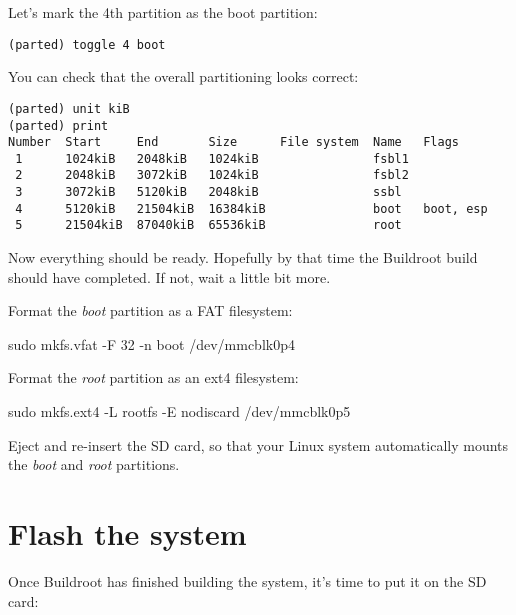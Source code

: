 Let's mark the 4th partition as the boot partition:

\begin{verbatim}
(parted) toggle 4 boot
\end{verbatim}

You can check that the overall partitioning looks correct:

\begin{verbatim}
(parted) unit kiB
(parted) print
Number  Start     End       Size      File system  Name   Flags
 1      1024kiB   2048kiB   1024kiB                fsbl1
 2      2048kiB   3072kiB   1024kiB                fsbl2
 3      3072kiB   5120kiB   2048kiB                ssbl
 4      5120kiB   21504kiB  16384kiB               boot   boot, esp
 5      21504kiB  87040kiB  65536kiB               root
\end{verbatim}

Now everything should be ready. Hopefully by that time the Buildroot
build should have completed. If not, wait a little bit more.

Format the {\em boot} partition as a FAT filesystem:

\begin{bashinput}
sudo mkfs.vfat -F 32 -n boot /dev/mmcblk0p4
\end{bashinput}

Format the {\em root} partition as an ext4 filesystem:

\begin{bashinput}
sudo mkfs.ext4 -L rootfs -E nodiscard /dev/mmcblk0p5
\end{bashinput}

Eject and re-insert the SD card, so that your Linux system
automatically mounts the {\em boot} and {\em root} partitions.

\section{Flash the system}

Once Buildroot has finished building the system, it's time to put it
on the SD card:


